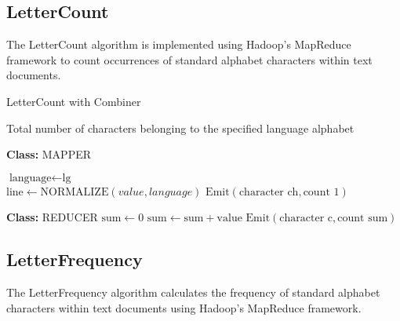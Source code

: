     

\subsection{LetterCount}
The LetterCount algorithm is implemented using Hadoop's MapReduce framework to count occurrences of standard alphabet characters within text documents. \\ 

\begin{algorithm}
    \caption{LetterCount with Combiner}
    \begin{algorithmic}[1]
    \Ensure Total number of characters belonging to the specified language alphabet
    \\
    \Statex
    
    \textbf{Class:} MAPPER

        \State $\text{language} \gets \text{lg}$ 
    \EndProcedure\\
    
        \State $\text{line} \gets \text{NORMALIZE}(value, language)$ 
                \State $\text{Emit}(\text{character ch}, \text{count 1})$ 
        \EndFor
    \EndProcedure\\
        
    \Statex
    
    \textbf{Class:} REDUCER
        \State $\text{sum} \gets 0$  
            \State $\text{sum} \gets \text{sum} + \text{value}$ 
        \EndFor
        \State $\text{Emit}(\text{character c}, \text{count sum})$ 
    \EndProcedure
    \end{algorithmic}
    \end{algorithm}

\newpage

\subsection{LetterFrequency}
The LetterFrequency algorithm calculates the frequency of standard alphabet characters within text documents using Hadoop's MapReduce framework. \\ 


